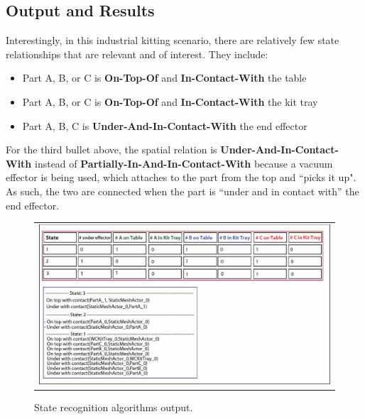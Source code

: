 \documentclass[preprint,12pt]{elsarticle}
\newcommand{\sr}[1] {\textbf{#1}}
\begin{document}
\subsection{Output and Results}
Interestingly, in this industrial kitting scenario, there are relatively few state relationships that are relevant and of interest. They include:
\begin{itemize}
 \item Part A, B, or C is \sr{On-Top-Of} and \sr{In-Contact-With} the table
 \item Part A, B, or C is \sr{On-Top-Of} and \sr{In-Contact-With} the kit tray
 \item Part A, B, C is \sr{Under-And-In-Contact-With} the end effector
\end{itemize}

For the third bullet above, the spatial relation is \sr{Under-And-In-Contact-With} instead of \sr{Partially-In-And-In-Contact-With} because a vacuum effector is being used, which attaches to the part from the top and ``picks it up". As such, the two are connected when the part is ``under and in contact with'' the end effector.

\begin{figure}[h!t!]
\begin{center}
\begin{tabular}{c}
\includegraphics[width=13cm]{checker.pdf}
\end{tabular}
\end{center}
\caption{State recognition algorithms output.}
\label{fig:staterecognition}
\end{figure}
\end{document}
